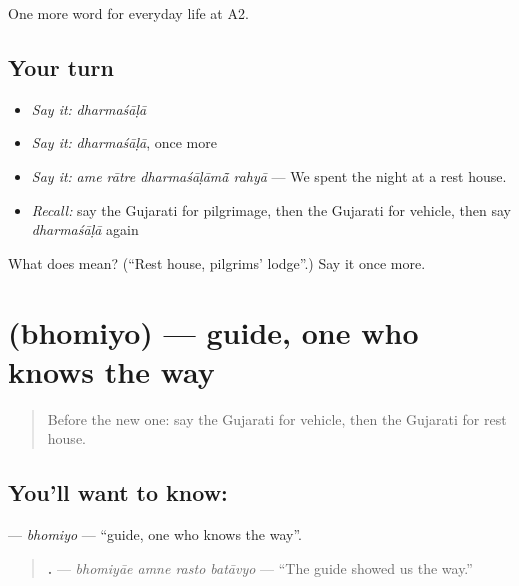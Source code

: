 \begin{grammarlens}[title={What you've built}]
One more word for everyday life at A2.
\end{grammarlens}

\subsection*{Your turn}
\begin{itemize}
\raggedright
  \item \emph{Say it:} \emph{dharmaśāḷā}
  \item \emph{Say it:} \emph{dharmaśāḷā}, once more
  \item \emph{Say it:} \emph{ame rātre dharmaśāḷāmā̃ rahyā} — We spent the night at a rest house.
  \item \emph{Recall:} say the Gujarati for pilgrimage, then the Gujarati for vehicle, then say \emph{dharmaśāḷā} again
\end{itemize}

\begin{tcolorbox}[breakable,colback=teal!4,colframe=teal!35!black,title={Before you move on}]
What does  mean? (\textquotedblleft{}Rest house, pilgrims' lodge\textquotedblright{}.) Say it once more.
\end{tcolorbox}
\section[\texorpdfstring{\gu{ભોમિયો} (bhomiyo)}{ભોમિયો (bhomiyo)}]{ (bhomiyo) — guide, one who knows the way}

\label{lesson:GU-C212-bhomiyo}



\begin{quote}
Before the new one: say the Gujarati for vehicle, then the Gujarati for rest house.
\end{quote}

\subsection*{You'll want to know: }
\textbf{} — \emph{bhomiyo} — \textquotedblleft{}guide, one who knows the way\textquotedblright{}.

\begin{quote}
\textbf{   .} — \emph{bhomiyāe amne rasto batāvyo} — \textquotedblleft{}The guide showed us the way.\textquotedblright{}
\end{quote}

